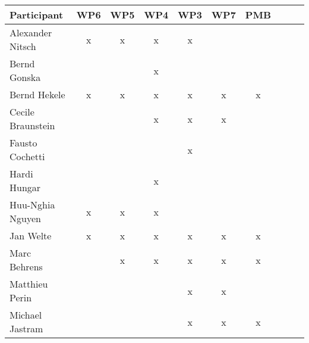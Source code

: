 \documentclass[a4paper, 11pt]{article}
\begin{document}
\begin{tabular}{|l|c|c|c||c|c|c||c|c|c|}
\hline
\textbf{Participant} & \textbf{WP6} &  \textbf{WP5} & \textbf{WP4}&  \textbf{WP3} & \textbf{WP7}&  \textbf{PMB} \\\hline
Alexander Nitsch     & x & x & x & x &   &   \\\hline  
Bernd Gonska         &   &   & x &   &   &   \\\hline
Bernd Hekele         & x & x & x & x & x & x \\\hline
Cecile Braunstein    &   &   & x & x & x &   \\\hline
Fausto Cochetti      &   &   &   & x &   &   \\\hline
Hardi Hungar         &   &   & x &   &   &   \\\hline
Huu-Nghia Nguyen     & x & x & x &   &   &   \\\hline
Jan Welte            & x & x & x & x & x & x \\\hline
Marc Behrens         &   & x & x & x & x & x \\\hline
Matthieu Perin       &   &   &   & x & x &   \\\hline
Michael Jastram      &   &   &   & x & x & x \\\hline

\end{tabular}
\end{document}
